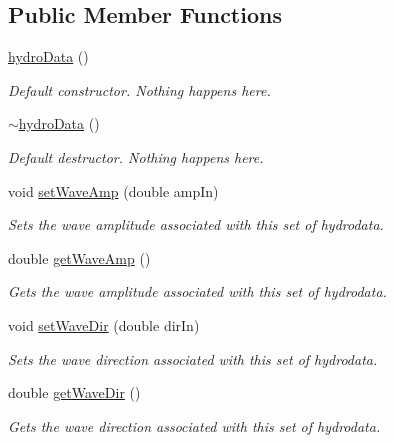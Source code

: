 \subsection*{Public Member Functions}
\begin{DoxyCompactItemize}
\item 
\hyperlink{classosea_1_1ofreq_1_1hydro_data_ab5168addb3599feb46d4a792ea406681}{hydro\-Data} ()
\begin{DoxyCompactList}\small\item\em Default constructor. Nothing happens here. \end{DoxyCompactList}\item 
\hyperlink{classosea_1_1ofreq_1_1hydro_data_a3714a7ac79e71906a362b24d4aee9a3c}{$\sim$hydro\-Data} ()
\begin{DoxyCompactList}\small\item\em Default destructor. Nothing happens here. \end{DoxyCompactList}\item 
void \hyperlink{classosea_1_1ofreq_1_1hydro_data_ae78455bf7bc4f2eaa6b1609d206c4e2d}{set\-Wave\-Amp} (double amp\-In)
\begin{DoxyCompactList}\small\item\em Sets the wave amplitude associated with this set of hydrodata. \end{DoxyCompactList}\item 
double \hyperlink{classosea_1_1ofreq_1_1hydro_data_abf0e887d717ece50b5415b911240785d}{get\-Wave\-Amp} ()
\begin{DoxyCompactList}\small\item\em Gets the wave amplitude associated with this set of hydrodata. \end{DoxyCompactList}\item 
void \hyperlink{classosea_1_1ofreq_1_1hydro_data_a8146a7d0d494e50f0463150589758afa}{set\-Wave\-Dir} (double dir\-In)
\begin{DoxyCompactList}\small\item\em Sets the wave direction associated with this set of hydrodata. \end{DoxyCompactList}\item 
double \hyperlink{classosea_1_1ofreq_1_1hydro_data_a1ba2ac3924aac32d18092b596f9f61c9}{get\-Wave\-Dir} ()
\begin{DoxyCompactList}\small\item\em Gets the wave direction associated with this set of hydrodata. \end{DoxyCompactList}\item 

\end{DoxyCompactItemize}

